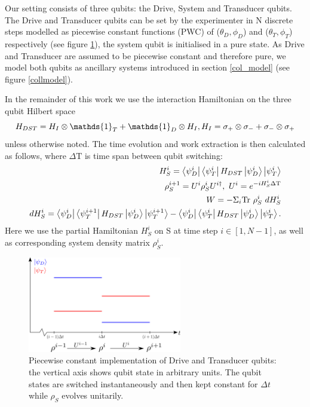 Our setting consists of three qubits: the Drive, System and Transducer qubits. The Drive and Transducer qubits can be set by the experimenter in N discrete steps modelled as piecewise constant functions (PWC) of ($\theta_D, \phi_D$) and ($\theta_T, \phi_T$) respectively (see figure \ref{pwc}), the system qubit is initialised in a pure state.
As Drive and Transducer are assumed to be piecewise constant and therefore pure, we model both qubits as ancillary systems introduced in section \ref{col_model} (see figure \ref{collmodel}).

In the remainder of this work we use the interaction Hamiltonian on the three qubit Hilbert space
\begin{equation*}
	H_{DST} = H_{I} \otimes \mathds{1}_T + \mathds{1}_D \otimes H_{I}, \\
	H_{I} = \sigma_{+} \otimes \sigma_{-} + \sigma_{-} \otimes \sigma_{+}
\end{equation*}
unless otherwise noted.
The time evolution and work extraction is then calculated as follows, where $\Delta \mathrm{T}$ is time span between qubit switching:
\begin{align}
	H_S^i = \bra{\psi_D^i}\bra{\psi_T^i} H_{DST} \ket{\psi_D^i} \ket{\psi_T^i} \\
	\rho_S^{i+1} = U^i \rho_S^i U^{i\dagger}, \ U^i = e^{-iH_S^i \Delta \mathrm{T}} \\
	W = - \Sigma_i \mathrm{Tr} \ \rho_S^i \ dH_S^i \\
	dH_S^i = \bra{\psi_D^i}\bra{\psi_T^{i+1}} H_{DST} \ket{\psi_D^i} \ket{\psi_T^{i+1}} - \bra{\psi_D^i}\bra{\psi_T^i} H_{DST} \ket{\psi_D^i} \ket{\psi_T^i}.	
\end{align}
Here we use the partial Hamiltonian $H_S^i$ on S at time step $i \in [1, N - 1]$, as well as corresponding system density matrix $\rho_S^i$.


\begin{figure}
	\centering
	\includegraphics[width=0.6\textwidth]{img/pwc}
	\caption{Piecewise constant implementation of Drive and Transducer qubits: the vertical axis shows qubit state in arbitrary units. The qubit states are switched instantaneously and then kept constant for $\Delta t$ while $\rho_S$ evolves unitarily.}
	\label{pwc}
\end{figure}

